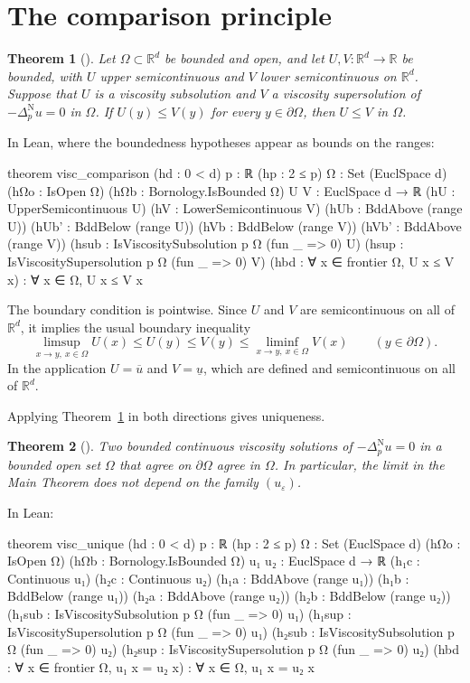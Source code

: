 \documentclass[11pt,reqno]{amsart}
\newcommand{\R}{\mathbb{R}}
\newcommand{\eps}{\varepsilon}
\newcommand{\pnlap}{\Delta_p^{\mathrm{N}}}       %
\theoremstyle{plain}
\newtheorem{theorem}{Theorem}[section]
\theoremstyle{definition}
\theoremstyle{remark}
\begin{document}
\section{The comparison principle}\label{sec:cp}

\begin{theorem}[]\label{thm:C}
Let $\Omega \subset \R^d$ be bounded and open, and let $U, V \colon \R^d \to \R$
be bounded, with $U$ upper semicontinuous and $V$ lower semicontinuous on
$\R^d$. Suppose that $U$ is a viscosity subsolution and $V$ a viscosity
supersolution of $-\pnlap u = 0$ in $\Omega$. If $U(y) \le V(y)$ for every
$y \in \partial\Omega$, then $U \le V$ in $\Omega$.
\end{theorem}

\noindent In Lean, where the boundedness hypotheses appear as bounds on the
ranges:
\begin{lean}
theorem visc_comparison (hd : 0 < d) {p : ℝ} (hp : 2 ≤ p) {Ω : Set (EuclSpace d)}
    (hΩo : IsOpen Ω) (hΩb : Bornology.IsBounded Ω) {U V : EuclSpace d → ℝ}
    (hU : UpperSemicontinuous U) (hV : LowerSemicontinuous V)
    (hUb : BddAbove (range U)) (hUb' : BddBelow (range U))
    (hVb : BddBelow (range V)) (hVb' : BddAbove (range V))
    (hsub : IsViscositySubsolution p Ω (fun _ => 0) U)
    (hsup : IsViscositySupersolution p Ω (fun _ => 0) V)
    (hbd : ∀ x ∈ frontier Ω, U x ≤ V x) :
    ∀ x ∈ Ω, U x ≤ V x
\end{lean}

The boundary condition is pointwise. Since $U$ and $V$ are semicontinuous on
all of $\R^d$, it implies the usual boundary inequality
\[
  \limsup_{x \to y,\ x \in \Omega} U(x) \le U(y) \le V(y)
  \le \liminf_{x \to y,\ x \in \Omega} V(x) \qquad (y \in \partial\Omega).
\]
In the application $U = \overline u$ and $V = \underline u$, which are defined
and semicontinuous on all of $\R^d$.

Applying Theorem~\ref{thm:C} in both directions gives uniqueness.

\begin{theorem}[]\label{thm:unique}
Two bounded continuous viscosity solutions of $-\pnlap u = 0$ in a bounded open
set $\Omega$ that agree on $\partial\Omega$ agree in $\Omega$. In particular,
the limit in the Main Theorem does not depend on the family $(u_\eps)$.
\end{theorem}

\noindent In Lean:
\begin{lean}
theorem visc_unique (hd : 0 < d) {p : ℝ} (hp : 2 ≤ p)
    {Ω : Set (EuclSpace d)} (hΩo : IsOpen Ω) (hΩb : Bornology.IsBounded Ω)
    {u₁ u₂ : EuclSpace d → ℝ}
    (h₁c : Continuous u₁) (h₂c : Continuous u₂)
    (h₁a : BddAbove (range u₁)) (h₁b : BddBelow (range u₁))
    (h₂a : BddAbove (range u₂)) (h₂b : BddBelow (range u₂))
    (h₁sub : IsViscositySubsolution p Ω (fun _ => 0) u₁)
    (h₁sup : IsViscositySupersolution p Ω (fun _ => 0) u₁)
    (h₂sub : IsViscositySubsolution p Ω (fun _ => 0) u₂)
    (h₂sup : IsViscositySupersolution p Ω (fun _ => 0) u₂)
    (hbd : ∀ x ∈ frontier Ω, u₁ x = u₂ x) :
    ∀ x ∈ Ω, u₁ x = u₂ x
\end{lean}
\end{document}
